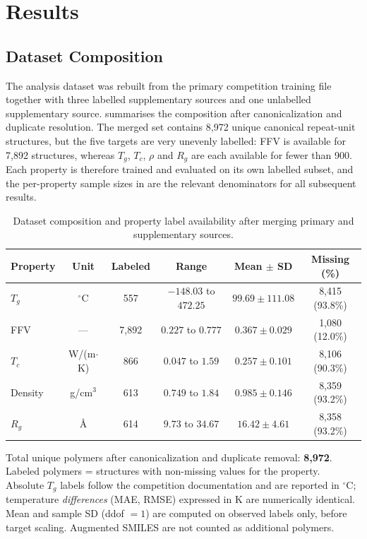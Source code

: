 \documentclass{article}
\begin{document}
\section{Results}

\subsection{Dataset Composition}

The analysis dataset was rebuilt from the primary competition training file together with three labelled supplementary sources and one unlabelled supplementary source.  summarises the composition after canonicalization and duplicate resolution. The merged set contains 8{,}972 unique canonical repeat-unit structures, but the five targets are very unevenly labelled: FFV is available for 7{,}892 structures, whereas $T_g$, $T_c$, $\rho$ and $R_g$ are each available for fewer than 900. Each property is therefore trained and evaluated on its own labelled subset, and the per-property sample sizes in  are the relevant denominators for all subsequent results.

\begin{table}[H]
\centering
\caption{Dataset composition and property label availability after merging primary and supplementary sources.}
\label{tab:dataset_composition}
\begin{tabular}{lccccc}
\toprule
\textbf{Property} & \textbf{Unit} & \textbf{Labeled} & \textbf{Range} & \textbf{Mean $\pm$ SD} & \textbf{Missing (\%)} \\
\midrule
$T_g$ & $^\circ$C & 557 & $-148.03$ to $472.25$ & $99.69 \pm 111.08$ & 8,415 (93.8\%) \\
FFV & --- & 7,892 & $0.227$ to $0.777$ & $0.367 \pm 0.029$ & 1,080 (12.0\%) \\
$T_c$ & W/(m$\cdot$K) & 866 & $0.047$ to $1.59$ & $0.257 \pm 0.101$ & 8,106 (90.3\%) \\
Density & g/cm$^3$ & 613 & $0.749$ to $1.84$ & $0.985 \pm 0.146$ & 8,359 (93.2\%) \\
$R_g$ & \AA & 614 & $9.73$ to $34.67$ & $16.42 \pm 4.61$ & 8,358 (93.2\%) \\
\bottomrule
\end{tabular}

\vspace{0.5em}
\footnotesize
Total unique polymers after canonicalization and duplicate removal: \textbf{8,972}. \\
Labeled polymers = structures with non-missing values for the property. Absolute $T_g$ labels follow the competition documentation and are reported in $^\circ$C; temperature \emph{differences} (MAE, RMSE) expressed in K are numerically identical. Mean and sample SD (ddof $= 1$) are computed on observed labels only, before target scaling. Augmented SMILES are not counted as additional polymers.
\end{table}
\end{document}
